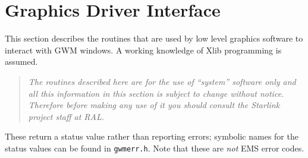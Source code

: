 \documentclass[twoside,11pt]{article}
\newcommand{\htmladdnormallink}[2]{#1}
\renewcommand{\_}{\texttt{\symbol{95}}}
\begin{document}
\section{Graphics Driver Interface}

This section describes the routines that are used by low level graphics 
software to interact with GWM windows. A working knowledge of Xlib
programming is assumed.
\begin{quote}{\em
The routines described here are for the use of ``system'' software only
and all this information in this section is subject to change without
notice. Therefore before making any use of it you should consult the 
\htmladdnormallink{Starlink project staff}{http://star-www.rl.ac.uk/people.html}
at RAL.}
\end{quote}
These return a status value rather than reporting errors; symbolic names
for the status values can be found in {\tt gwm\_err.h}. Note that these are
{\em not} EMS error codes.
\end{document}
